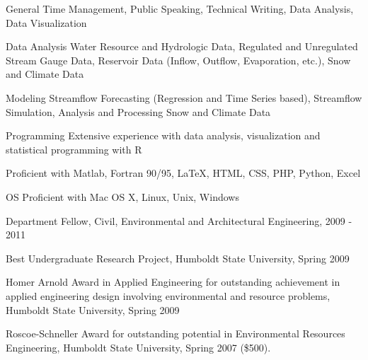 \documentclass[10pt,a4paper]{scrartcl}
\begin{document}
\begin{cv}{}
        \begin{cvlist}{}\label{skills}
            \item[General] Time Management, Public Speaking, Technical Writing, Data Analysis, Data Visualization
            \item[Data Analysis] Water Resource and Hydrologic Data, Regulated and Unregulated Stream Gauge Data, Reservoir Data (Inflow, Outflow, Evaporation, etc.), Snow and Climate Data
            \item[Modeling] Streamflow Forecasting (Regression and Time Series based), Streamflow Simulation, Analysis and Processing Snow and Climate Data
            \item[Programming] Extensive experience with data analysis, visualization and statistical programming with R
            \item Proficient with Matlab, Fortran 90/95, \LaTeX, HTML, CSS, PHP, Python, Excel
            \item[OS] Proficient with Mac OS X, Linux, Unix, Windows            

        \end{cvlist}
        
        
        \begin{cvlist}{}\label{awards}
            \item   Department Fellow, Civil, Environmental and Architectural Engineering, 2009 - 2011
            \item   Best Undergraduate Research Project, Humboldt State University, Spring 2009
            \item   Homer Arnold Award in Applied Engineering for outstanding achievement in applied engineering design involving environmental and resource problems, Humboldt State University, Spring 2009 
            \item   Roscoe-Schneller Award for outstanding potential in Environmental Resources Engineering, Humboldt State University, Spring 2007 (\$500).


\end{cvlist}
\end{cv}
\end{document}

